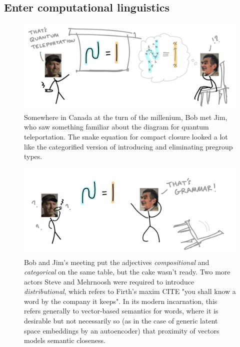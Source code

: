 \subsection{Enter computational linguistics}

\begin{figure}[h!]
\includegraphics{figures/cartoons/boblambek1}
\caption{Somewhere in Canada at the turn of the millenium, Bob met Jim, who saw something familiar about the diagram for quantum teleportation. The snake equation for compact closure looked a lot like the categorified version of introducing and eliminating pregroup types.
}
\end{figure}

\begin{figure}[h!]
\includegraphics{figures/cartoons/boblambek2}
\caption{Bob and Jim's meeting put the adjectives \emph{compositional} and \emph{categorical} on the same table, but the cake wasn't ready. Two more actors Steve and Mehrnoosh were required to introduce \emph{distributional}, which refers to Firth's maxim \bR CITE \e "you shall know a word by the company it keeps". In its modern incarnation, this refers generally to vector-based semantics for words, where it is desirable but not necessarily so (as in the case of generic latent space embeddings by an autoencoder) that proximity of vectors models semantic closeness.}
\end{figure}

